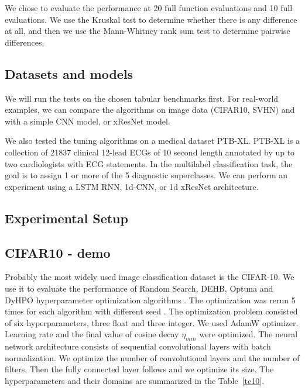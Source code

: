 We chose to evaluate the performance at 20 full function evaluations and 10 full evaluations. We use the Kruskal test to determine whether there is any difference at all, and then we use the Mann-Whitney rank sum test to determine pairwise differences.


\subsection{Datasets and models}
We will run the tests on the chosen tabular benchmarks first. For real-world examples, we can compare the algorithms on image data (CIFAR10, SVHN) and with a simple CNN model, or xResNet model.

We also tested the tuning algorithms on a medical dataset PTB-XL. PTB-XL is a collection of 21837 clinical 12-lead ECGs of 10 second length annotated by up to two cardiologists with ECG statements. In the multilabel classification task, the goal is to assign 1 or more of the 5 diagnostic superclasses. We can perform an experiment using a LSTM RNN, 1d-CNN, or 1d xResNet architecture.


\subsection{Experimental Setup}




\subsection{CIFAR10 - demo}

Probably the most widely used image classification dataset is the CIFAR-10. We use it to evaluate the performance of Random Search, DEHB, Optuna and DyHPO hyperparameter optimization algorithms . The optimization was rerun 5 times for each algorithm with different seed . The optimization problem consisted of six hyperparameters, three float and three integer. We used AdamW optimizer. Learning rate and the final value of cosine decay $\eta_{min}$ were optimized. The neural network architecture consists of sequential convolutional layers with batch normalization. We optimize the number of convolutional layers and the number of filters. Then the fully connected layer follows and we optimize its size. The hyperparameters and their domains are summarized in the Table~\ref{tc10}.


